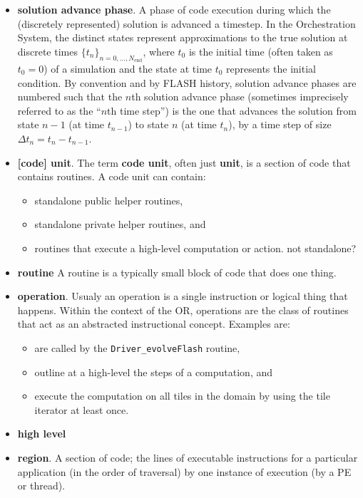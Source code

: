 \documentclass{article}
\begin{document}
\begin{itemize}
\item \textbf{solution advance phase}.
A phase of code execution during which the (discretely represented) solution
is advanced a timestep.
In the Orchestration System,
the distinct states represent approximations to the true solution
at discrete times $\{t_n\}_{n=0,\ldots,N_{\mathrm{end}}}$, where
$t_0$ is the initial time (often taken as $t_0=0$) of a simulation and
the state at time $t_0$ represents the initial condition.
By convention and by FLASH history, solution advance phases
are numbered such that
the $n$th solution advance phase (sometimes imprecisely referred
to as the ``$n$th time step'') is the one that
advances the solution from state $n-1$ (at time $t_{n-1}$) to
state $n$ (at time $t_n$),
by a time step of size $\Delta t_n = t_n - t_{n-1}$.


\item \textbf{[code] unit}.
The term \textbf{code unit}, often just \textbf{unit}, is a section of code that contains routines.
A code unit can contain:
\begin{itemize}
\item{standalone public helper routines,}
\item{standalone private helper routines, and}
\item{routines that execute a high-level computation or action. not standalone?}
\end{itemize}

\item \textbf{routine} A routine is a typically small block of code that does one thing.

\item \textbf{operation}.
Usualy an operation is a single instruction or logical thing that happens. Within the context of the OR,
operations are the class of routines that act as an abstracted instructional concept.
Examples are:
\begin{itemize}
\item{are called by the \texttt{Driver\_evolveFlash} routine,}
\item{outline at a high-level the steps of a computation, and}
\item{execute the computation on all tiles in the domain by using the tile
iterator at least once.}
\end{itemize}

\item \textbf{high level}

\item \textbf{region}.
A section of code; the lines of executable instructions for a particular
application (in the order of traversal) by one instance of execution
(by a PE or thread).


\end{itemize}
\end{document}
